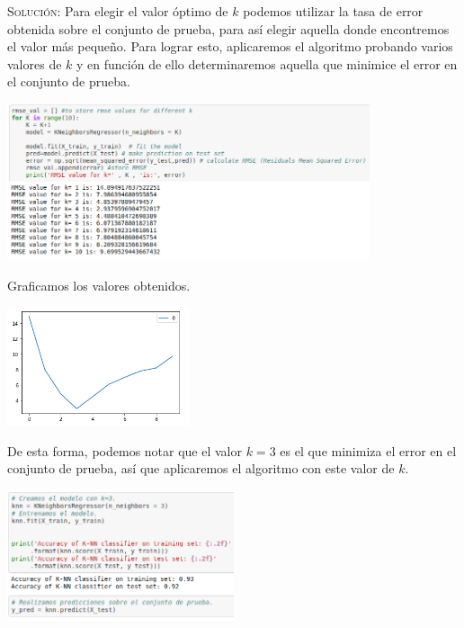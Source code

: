 \documentclass[letterpaper,11pt]{article}
\begin{document}
\begin{enumerate}
\begin{enumerate}
        \textsc{Solución:} Para elegir el valor óptimo de $k$ podemos utilizar 
        la tasa de error obtenida sobre el conjunto de prueba, para así elegir 
        aquella donde encontremos el valor más pequeño. Para lograr esto, 
        aplicaremos el algoritmo probando varios valores de $k$ y en función de 
        ello determinaremos aquella que minimice el error en el conjunto de 
        prueba.
        \begin{center}
            \includegraphics[width=0.8\textwidth]{imagenes/k_value.png}
        \end{center}

        Graficamos los valores obtenidos.
        \begin{center}
            \includegraphics[width=0.4\textwidth]{imagenes/k_grafica.png}
        \end{center}

        De esta forma, podemos notar que el valor $k=3$ es el que minimiza el
        error en el conjunto de prueba, así que aplicaremos el algoritmo con 
        este valor de $k$.
        \begin{center}
            \includegraphics[width=0.5\textwidth]{imagenes/k_modelo.png}
        \end{center}


\end{enumerate}
\end{enumerate}
\end{document}
